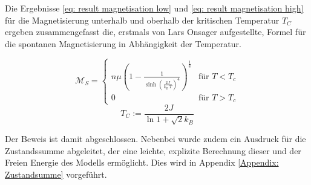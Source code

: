 
Die Ergebnisse \eqref{eq: result magnetisation low} und \eqref{eq: result magnetisation high} für die Magnetisierung unterhalb und oberhalb der kritischen Temperatur $T_C$ ergeben zusammengefasst die, erstmals von Lars Onsager aufgestellte, Formel für die spontanen Magnetisierung in Abhängigkeit der Temperatur.

\begin{grayframe}[frametitle = {Spontane Magnetisierung des 2d Ising-Modells}]
\begin{equation} \label{eq: result Magnetisation}
\mathcal{M}_S = \left\{ \begin{array}{cr} n \mu \left(1-\frac{1}{\sinh(\frac{2J}{k_B\,T})^4}\right)^{\frac{1}{8}} & \text{für } T < T_c \\ 0 &\text{für } T > T_c   \end{array} \right.
\end{equation}
\begin{equation} 
T_C  := \frac{2 J}{ \ln{1+\sqrt{2}} k_B}
\end{equation}
\end{grayframe}

\noindent Der Beweis ist damit abgeschlossen. Nebenbei wurde zudem ein Ausdruck für die Zustandssumme abgeleitet, der eine leichte, explizite Berechnung dieser und der Freien Energie des Modells ermöglicht. Dies wird in Appendix \ref{Appendix: Zustandsumme} vorgeführt.\\

